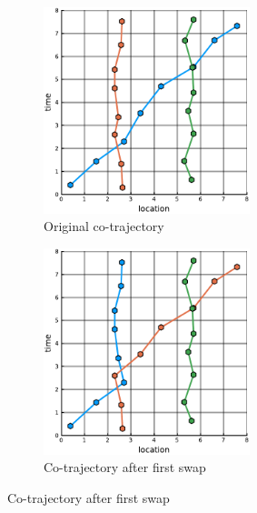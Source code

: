 \documentclass[12pt]{article}
\theoremstyle{definition}
\begin{document}
\begin{figure}
    \centering
    \begin{subfigure}[t]{0.45\textwidth}
      \includegraphics[width=6cm]{swaporder-a.pdf}
      \caption{Original co-trajectory}
      \label{fig:swap-order-a}
    \end{subfigure}
    \begin{subfigure}[t]{0.45\textwidth}
      \includegraphics[width=6cm]{swaporder-b.pdf}
      \caption{Co-trajectory after first swap}
      \label{fig:swap-order-b}
    \end{subfigure}


\end{figure}
\end{document}
